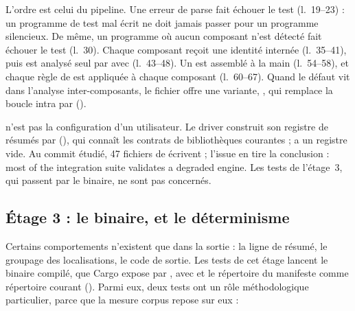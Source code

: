 
L'ordre est celui du pipeline. Une erreur de parse fait échouer le test (l.~19--23) : un programme de test mal écrit ne doit jamais passer pour un programme silencieux. De même, un programme où aucun composant n'est détecté fait échouer le test (l.~30). Chaque composant reçoit une identité internée (l.~35--41), puis est analysé seul par  avec  (l.~43--48). Un  est assemblé à la main (l.~54--58), et chaque règle de  est appliquée à chaque composant (l.~60--67). Quand le défaut vit dans l'analyse inter-composants, le fichier offre une variante, , qui remplace la boucle intra par  ().

\begin{piege}
 n'est pas la configuration d'un utilisateur. Le driver construit son registre de résumés par  (), qui connaît les contrats de bibliothèques courantes ;  a un registre vide. Au commit étudié, 47 fichiers de  écrivent  ; l'issue  en tire la conclusion : \og most of the integration suite validates a degraded engine\fg{}. Les tests de l'étage~3, qui passent par le binaire, ne sont pas concernés.
\end{piege}

\subsection{Étage 3 : le binaire, et le déterminisme}

Certains comportements n'existent que dans la sortie : la ligne de résumé, le groupage des localisations, le code de sortie. Les tests de cet étage lancent le binaire compilé, que Cargo expose par , avec  et le répertoire du manifeste comme répertoire courant (). Parmi eux, deux tests ont un rôle méthodologique particulier, parce que la mesure corpus repose sur eux :


